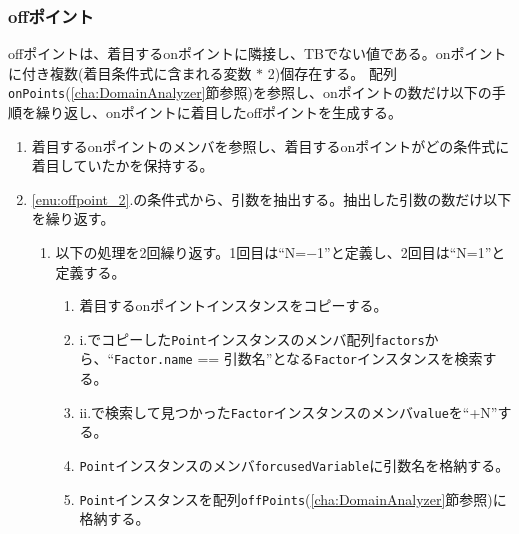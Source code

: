 \documentclass[uplatex, report, a4j, 10pt]{jsbook}
\newcommand\ttt[1]{\texttt{#1}}
\begin{document}
\subsubsection{offポイント}
offポイントは、着目するonポイントに隣接し、TBでない値である。onポイントに付き複数(着目条件式に含まれる変数 $*$ 2)個存在する。
配列\ttt{onPoints}(\ref{cha:DomainAnalyzer}節参照)を参照し、onポイントの数だけ以下の手順を繰り返し、onポイントに着目したoffポイントを生成する。
\begin{enumerate}
  \item\label{enu:offpoint_2} 着目するonポイントのメンバ\forcusedConditionalExpression{}を参照し、着目するonポイントがどの条件式に着目していたかを保持する。
  \item \ref{enu:offpoint_2}.の条件式から、引数を抽出する。抽出した引数の数だけ以下を繰り返す。
        \begin{enumerate}
          \item 以下の処理を2回繰り返す。1回目は``N=$-$1''と定義し、2回目は``N=1''と定義する。
                \begin{enumerate}
                  \item\label{enu:offpoint_3} 着目するonポイントインスタンスをコピーする。
                  \item\label{enu:offpoint_1} i.でコピーした\ttt{Point}インスタンスのメンバ配列\ttt{factors}から、``\ttt{Factor.name} == 引数名''となる\ttt{Factor}インスタンスを検索する。
                  \item ii.で検索して見つかった\ttt{Factor}インスタンスのメンバ\ttt{value}を``+N''する。
                  \item \ttt{Point}インスタンスのメンバ\ttt{forcusedVariable}に引数名を格納する。
                  \item \ttt{Point}インスタンスを配列\ttt{offPoints}(\ref{cha:DomainAnalyzer}節参照)に格納する。
                \end{enumerate}
        \end{enumerate}
\end{enumerate}
\end{document}
